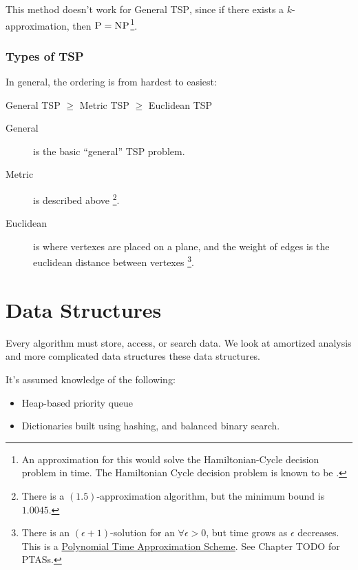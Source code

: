                     This method doesn't work for General \textsc{TSP}, since if there exists a $k$-approximation, then $\textsc{P}=\textsc{NP}$\footnote{An approximation for this would solve the Hamiltonian-Cycle decision problem in \p time. The Hamiltonian Cycle decision problem is known to be \npcomplete.}.
            \section{Types of \textsc{TSP}} %
            \label{sec:types_of_tsp}
                In general, the ordering is from hardest to easiest:

                General \textsc{TSP} $\ge$ Metric \textsc{TSP} $\ge$ Euclidean \textsc{TSP}

                \begin{description}
                    \item[General] is the basic ``general'' \textsc{TSP} problem.
                    \item[Metric] is described above
                    \footnote{There is a $(1.5)$-approximation algorithm, but the minimum bound is $1.0045$.}.
                    \item[Euclidean] is where vertexes are placed on a plane, and the weight of edges is the euclidean distance between vertexes
                    \footnote{There is an $(\epsilon+1)$-solution for an $\forall \epsilon > 0$, but time grows as $\epsilon$ decreases.
                    This is a \href{https://en.wikipedia.org/wiki/Polynomial-time_approximation_scheme}{Polynomial Time Approximation Scheme}. See Chapter TODO for PTASs.}.
                \end{description}
    \part{Data Structures} %
    \label{prt:data_ _structures_}
        Every algorithm must store, access, or search data.
        We look at amortized analysis and more complicated data structures these data structures.

        It's assumed knowledge of the following:
        \begin{itemize}
            \item Heap-based priority queue
            \item Dictionaries built using hashing, and balanced binary search.
        \end{itemize}
